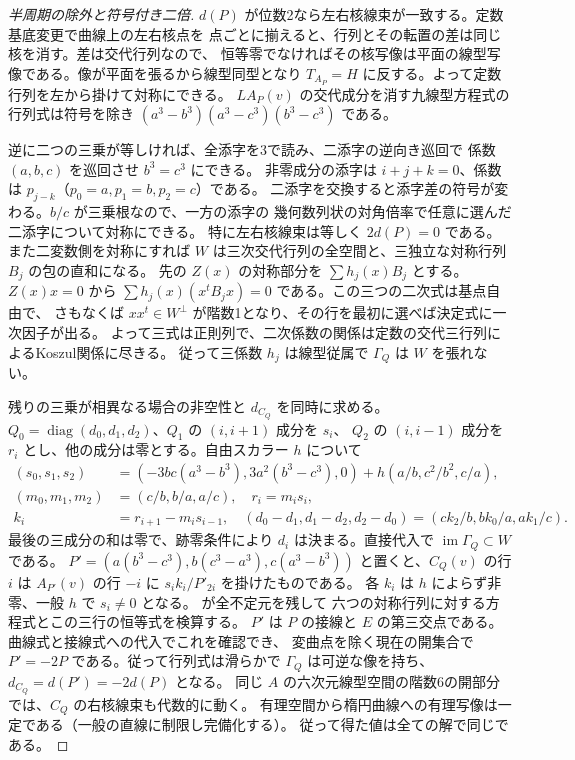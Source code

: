 \begin{proof}[半周期の除外と符号付き二倍]
$d(P)$ が位数2なら左右核線束が一致する。定数基底変更で曲線上の左右核点を
点ごとに揃えると、行列とその転置の差は同じ核を消す。差は交代行列なので、
恒等零でなければその核写像は平面の線型写像である。像が平面を張るから線型同型となり
$T_{A_P}=H$ に反する。よって定数行列を左から掛けて対称にできる。
$L A_P(v)$ の交代成分を消す九線型方程式の行列式は符号を除き
$(a^3-b^3)(a^3-c^3)(b^3-c^3)$ である。

逆に二つの三乗が等しければ、全添字を3で読み、二添字の逆向き巡回で
係数 $(a,b,c)$ を巡回させ $b^3=c^3$ にできる。
非零成分の添字は $i+j+k=0$、係数は $p_{j-k}$（$p_0=a,p_1=b,p_2=c$）である。
二添字を交換すると添字差の符号が変わる。$b/c$ が三乗根なので、一方の添字の
幾何数列状の対角倍率で任意に選んだ二添字について対称にできる。
特に左右核線束は等しく $2d(P)=0$ である。また二変数側を対称にすれば
$W$ は三次交代行列の全空間と、三独立な対称行列 $B_j$ の包の直和になる。
先の $Z(x)$ の対称部分を $\sum h_j(x) B_j$ とする。$Z(x)x=0$ から
$\sum h_j(x)(x^t B_j x)=0$ である。この三つの二次式は基点自由で、
さもなくば $xx^t\in W^\perp$ が階数1となり、その行を最初に選べば決定式に一次因子が出る。
よって三式は正則列で、二次係数の関係は定数の交代三行列によるKoszul関係に尽きる。
従って三係数 $h_j$ は線型従属で $\Gamma_Q$ は $W$ を張れない。

残りの三乗が相異なる場合の非空性と $d_{C_Q}$ を同時に求める。
$Q_0=\operatorname{diag}(d_0,d_1,d_2)$、$Q_1$ の $(i,i+1)$ 成分を $s_i$、
$Q_2$ の $(i,i-1)$ 成分を $r_i$ とし、他の成分は零とする。自由スカラー $h$ について
\[
\begin{split}
 (s_0,s_1,s_2)&=(-3bc(a^3-b^3),3a^2(b^3-c^3),0)
                  +h(a/b,c^2/b^2,c/a),\\
 (m_0,m_1,m_2)&=(c/b,b/a,a/c),\quad r_i=m_i s_i,\\
 k_i&=r_{i+1}-m_i s_{i-1},\quad
 (d_0-d_1,d_1-d_2,d_2-d_0)=(c k_2/b,b k_0/a,a k_1/c).
\end{split}
\]
最後の三成分の和は零で、跡零条件により $d_i$ は決まる。直接代入で
$\operatorname{im}\Gamma_Q\subset W$ である。
$P'=(a(b^3-c^3),b(c^3-a^3),c(a^3-b^3))$ と置くと、$C_Q(v)$ の行 $i$ は
$A_{P'}(v)$ の行 $-i$ に $s_i k_i/P'_{2i}$ を掛けたものである。
各 $k_i$ は $h$ によらず非零、一般 $h$ で $s_i\ne0$ となる。
 が全不定元を残して
六つの対称行列に対する方程式とこの三行の恒等式を検算する。
$P'$ は $P$ の接線と $E$ の第三交点である。曲線式と接線式への代入でこれを確認でき、
変曲点を除く現在の開集合で $P'=-2P$ である。従って行列式は滑らかで
$\Gamma_Q$ は可逆な像を持ち、$d_{C_Q}=d(P')=-2d(P)$ となる。
同じ $A$ の六次元線型空間の階数6の開部分では、$C_Q$ の右核線束も代数的に動く。
有理空間から楕円曲線への有理写像は一定である（一般の直線に制限し完備化する）。
従って得た値は全ての解で同じである。


\end{proof}
